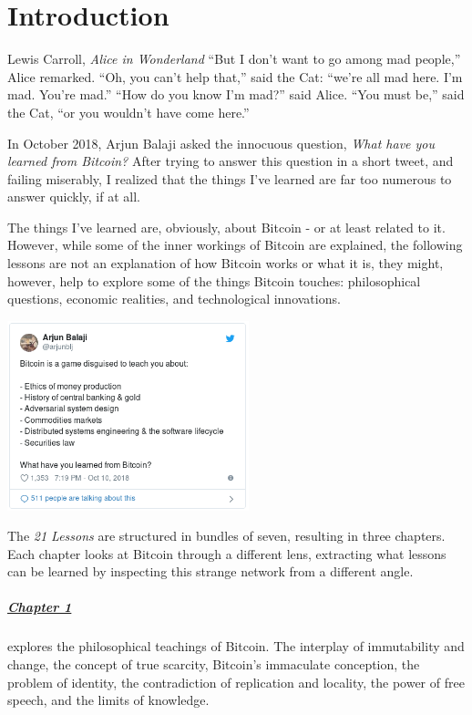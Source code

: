\chapter*{Introduction}
\label{ch:introduction}

\begin{chapquote}{Lewis Carroll, \textit{Alice in Wonderland}}
``But I don’t want to go among mad people,'' Alice remarked. ``Oh, you can’t
help that,'' said the Cat: ``we’re all mad here. I’m mad. You’re mad.'' ``How do
you know I’m mad?'' said Alice. ``You must be,'' said the Cat, ``or you wouldn’t
have come here.''
\end{chapquote}

In October 2018, Arjun Balaji asked the innocuous question,
\textit{What have you learned from Bitcoin?} After trying to answer this
question in a short tweet, and failing miserably, I realized that the things
I've learned are far too numerous to answer quickly, if at all.

The things I've learned are, obviously, about Bitcoin - or at least related to
it. However, while some of the inner workings of Bitcoin are explained, the
following lessons are not an explanation of how Bitcoin works or what it is,
they might, however, help to explore some of the things Bitcoin touches:
philosophical questions, economic realities, and technological innovations.

\begin{center}
  \includegraphics[width=7cm]{assets/images/the-tweet.png}
\end{center}

The \textit{21 Lessons} are structured in bundles of seven, resulting in three
chapters. Each chapter looks at Bitcoin through a different lens, extracting
what lessons can be learned by inspecting this strange network from a different
angle.

\paragraph{\hyperref[ch:philosophy]{Chapter 1}}{explores the philosophical
teachings of Bitcoin. The interplay of immutability and change, the concept of
true scarcity, Bitcoin's immaculate conception, the problem of identity, the
contradiction of replication and locality, the power of free speech, and the
limits of knowledge.
}

